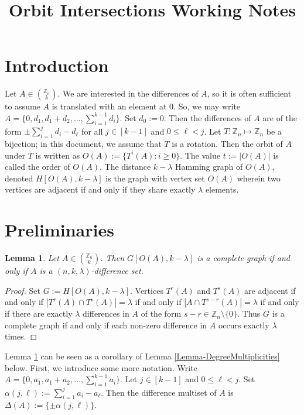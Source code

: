 \documentclass[12pt]{article}
\title{ \vspace{-3cm} Orbit Intersections Working Notes}
\newcommand{\Z}{\mathbb{Z}}
\newtheorem{lem}{Lemma} %
\theoremstyle{definition}
\begin{document}
	\maketitle
	\tableofcontents
	
	\section{Introduction}
	Let $A \in {\Z_n \choose k}$.  We are interested in the differences of $A$, so it is often sufficient to assume $A$ is translated with an element at $0$.  So, we may write $A = \{0, d_1, d_1+d_2, \ldots, \sum_{i=1}^{k-1}d_i\}$.  Set $d_0 := 0$.  Then the differences of $A$ are of the form $\pm \sum_{i=1}^{j}d_i - d_\ell$ for all $j \in [k-1]$ and $0 \leq \ell < j$.  Let $T: \Z_n \mapsto \Z_n$ be a bijection; in this document, we assume that $T$ is a rotation.  Then the orbit of $A$ under $T$ is written as $O(A) := \{T^i(A): i \geq 0\}$.  The value $t := |O(A)|$ is called the order of $O(A)$.  The distance $k-\lambda$ Hamming graph of $O(A)$, denoted $H[O(A),k-\lambda]$ is the graph with vertex set $O(A)$ wherein two vertices are adjacent if and only if they share exactly $\lambda$ elements.
	
	\section{Preliminaries}
	\begin{lem}\label{Lemma-DifferenceSetsAreCliques}
		Let $A \in {\Z_n \choose k}$.  Then $G[O(A),k-\lambda]$ is a complete graph if and only if $A$ is a $(n,k,\lambda)$-difference set.
	\end{lem}
	\begin{proof}
		Set $G := H[O(A),k-\lambda]$.  Vertices $T^r(A)$ and $T^s(A)$ are adjacent if and only if $|T^r(A) \cap T^s(A)| = \lambda$ if and only if $|A \cap T^{s-r}(A)| = \lambda$ if and only if there are exactly $\lambda$ differences in $A$ of the form $s-r \in \Z_n \setminus \{0\}$.  Thus $G$ is a complete graph if and only if each non-zero difference in $A$ occurs exactly $\lambda$ times.  \qedhere
	\end{proof}
	
	Lemma \ref{Lemma-DifferenceSetsAreCliques} can be seen as a corollary of Lemma \ref{Lemma-DegreeMultiplicities} below.  First, we introduce some more notation.  Write $A = \{0, a_1, a_1+a_2, \ldots, \sum_{i=1}^{k-1}a_i\}$.  Let $j \in [k-1]$ and $0 \leq \ell < j$.  Set $\alpha(j,\ell) := \sum_{i=1}^{j}a_i - a_\ell$.  Then the difference multiset of $A$ is $\Delta(A) := \{\pm \alpha(j,\ell)\}$.
\end{document}
